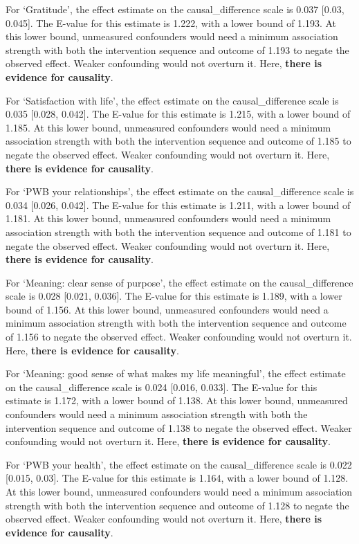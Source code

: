 \documentclass[
  single column]{article}
\begin{document}
For `Gratitude', the effect estimate on the causal\_difference scale is
0.037 {[}0.03, 0.045{]}. The E-value for this estimate is 1.222, with a
lower bound of 1.193. At this lower bound, unmeasured confounders would
need a minimum association strength with both the intervention sequence
and outcome of 1.193 to negate the observed effect. Weaker confounding
would not overturn it. Here, \textbf{there is evidence for causality}.

For `Satisfaction with life', the effect estimate on the
causal\_difference scale is 0.035 {[}0.028, 0.042{]}. The E-value for
this estimate is 1.215, with a lower bound of 1.185. At this lower
bound, unmeasured confounders would need a minimum association strength
with both the intervention sequence and outcome of 1.185 to negate the
observed effect. Weaker confounding would not overturn it. Here,
\textbf{there is evidence for causality}.

For `PWB your relationships', the effect estimate on the
causal\_difference scale is 0.034 {[}0.026, 0.042{]}. The E-value for
this estimate is 1.211, with a lower bound of 1.181. At this lower
bound, unmeasured confounders would need a minimum association strength
with both the intervention sequence and outcome of 1.181 to negate the
observed effect. Weaker confounding would not overturn it. Here,
\textbf{there is evidence for causality}.

For `Meaning: clear sense of purpose', the effect estimate on the
causal\_difference scale is 0.028 {[}0.021, 0.036{]}. The E-value for
this estimate is 1.189, with a lower bound of 1.156. At this lower
bound, unmeasured confounders would need a minimum association strength
with both the intervention sequence and outcome of 1.156 to negate the
observed effect. Weaker confounding would not overturn it. Here,
\textbf{there is evidence for causality}.

For `Meaning: good sense of what makes my life meaningful', the effect
estimate on the causal\_difference scale is 0.024 {[}0.016, 0.033{]}.
The E-value for this estimate is 1.172, with a lower bound of 1.138. At
this lower bound, unmeasured confounders would need a minimum
association strength with both the intervention sequence and outcome of
1.138 to negate the observed effect. Weaker confounding would not
overturn it. Here, \textbf{there is evidence for causality}.

For `PWB your health', the effect estimate on the causal\_difference
scale is 0.022 {[}0.015, 0.03{]}. The E-value for this estimate is
1.164, with a lower bound of 1.128. At this lower bound, unmeasured
confounders would need a minimum association strength with both the
intervention sequence and outcome of 1.128 to negate the observed
effect. Weaker confounding would not overturn it. Here, \textbf{there is
evidence for causality}.
\end{document}
